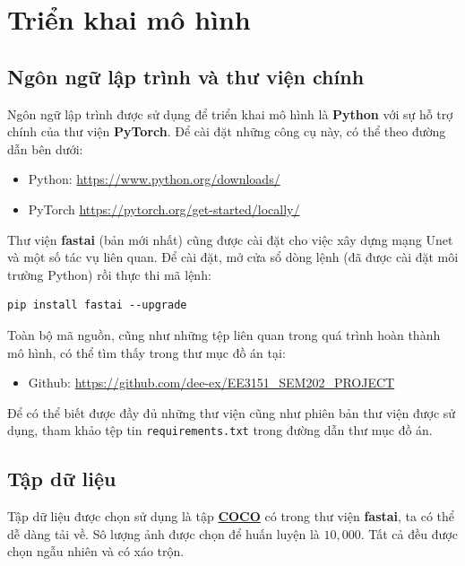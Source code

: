 \documentclass[a4paper, 12pt]{article}
\begin{document}
\section{Triển khai mô hình}

\subsection{Ngôn ngữ lập trình và thư viện chính}
Ngôn ngữ lập trình được sử dụng để triển khai mô hình là \textbf{Python} với sự hỗ trợ chính của thư viện \textbf{PyTorch}. Để cài đặt những công cụ này, có thể theo đường dẫn bên dưới:
\begin{itemize}
    \item Python: \href{https://www.python.org/downloads/}{https://www.python.org/downloads/}
    \item PyTorch \href{https://pytorch.org/get-started/locally/}{https://pytorch.org/get-started/locally/}
\end{itemize}
Thư viện \textbf{fastai} (bản mới nhất) cũng được cài đặt cho việc xây dựng mạng Unet và một số tác vụ liên quan. Để cài đặt, mở cửa sổ dòng lệnh (đã được cài đặt môi trường Python) rồi thực thi mã lệnh:
\begin{lstlisting}
pip install fastai --upgrade
\end{lstlisting}

\noindent
Toàn bộ mã nguồn, cũng như những tệp liên quan trong quá trình hoàn thành mô hình, có thể tìm thấy trong thư mục đồ án tại:
\begin{itemize}
    \item Github: \href{https://github.com/dee-ex/EE3151\_SEM202\_PROJECT}{https://github.com/dee-ex/EE3151\_SEM202\_PROJECT}
\end{itemize}
Để có thể biết được đầy đủ những thư viện cũng như phiên bản thư viện được sử dụng, tham khảo tệp tin \texttt{requirements.txt} trong đường dẫn thư mục đồ án.

\subsection{Tập dữ liệu}
Tập dữ liệu được chọn sử dụng là tập \href{https://cocodataset.org/#download}{\textbf{COCO}} có trong thư viện \textbf{fastai}, ta có thể dễ dàng tải về. Sô lượng ảnh được chọn để huấn luyện là $10,000$. Tất cả đều được chọn ngẫu nhiên và có xáo trộn.
\end{document}

